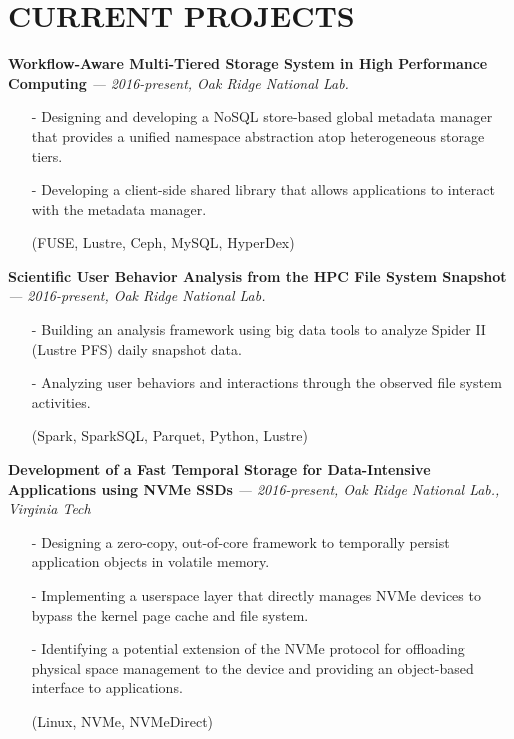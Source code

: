 \section{CURRENT PROJECTS}
\vspace{.03in}
  {\bf Workflow-Aware Multi-Tiered Storage System in High Performance Computing}
   {\it \footnotesize --- 2016-present, Oak Ridge National Lab.}
   \begin{itemize}[leftmargin=*]
    \setlength\itemsep{-0.02in}
    \item[-] Designing and developing a NoSQL store-based global metadata manager
	     that provides a unified namespace abstraction atop heterogeneous
	     storage tiers.
    \item[-] Developing a client-side shared library that allows applications to interact
             with the metadata manager.
    \item[] {\small(FUSE, Lustre, Ceph, MySQL, HyperDex)}
   \end{itemize}
  \vspace{-0.15in}
  {\bf Scientific User Behavior Analysis from the HPC File System Snapshot}
   {\it \footnotesize --- 2016-present, Oak Ridge National Lab.}
   \begin{itemize}[leftmargin=*]
    \setlength\itemsep{-0.02in}
    \item[-] Building an analysis framework using big data tools to analyze Spider II (Lustre PFS) daily snapshot data.
    \item[-] Analyzing user behaviors and interactions through the observed file system activities.
    \item[] {\small(Spark, SparkSQL, Parquet, Python, Lustre)}
   \end{itemize}
  \vspace{-0.15in}
  {\bf Development of a Fast Temporal Storage for Data-Intensive Applications using NVMe SSDs}
   {\it \footnotesize --- 2016-present, Oak Ridge National Lab., Virginia Tech}
   \begin{itemize}[leftmargin=*]
    \setlength\itemsep{-0.02in}
    \item[-] Designing a zero-copy, out-of-core framework to temporally persist
             application objects in volatile memory.
    \item[-] Implementing a userspace layer that directly manages NVMe
             devices to bypass the kernel page cache and file system.
    \item[-] Identifying a potential extension of the NVMe protocol 
             for offloading physical space management to the device and
             providing an object-based interface to applications.
    \item[] {\small(Linux, NVMe, NVMeDirect)}
   \end{itemize}
 
